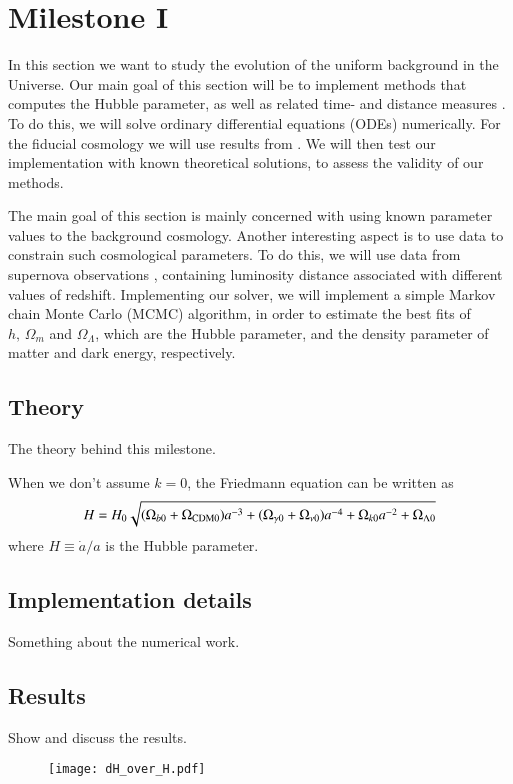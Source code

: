 \section{Milestone I}\label{M1}
In this section we want to study the evolution of the uniform background in the Universe. Our main goal of this section will be to implement methods that computes the Hubble parameter, as well as related time- and distance measures . To do this, we will solve  ordinary differential equations (ODEs) numerically. For the fiducial cosmology we will use results from \cite{Planck2020}. We will then test our implementation with known theoretical solutions, to assess the validity of our methods. 

The main goal of this section is mainly concerned with using known parameter values to  the background cosmology. Another interesting aspect is to use data to constrain such cosmological parameters. To do this, we will use data from supernova observations \cite{Supernova2014Betoule}, containing luminosity distance associated with different values of redshift. Implementing our solver, we will implement a simple Markov chain Monte Carlo (MCMC) algorithm, in order to estimate the best fits of $h,\,\Omega_m$ and $\Omega_\Lambda$, which are the Hubble parameter, and the density parameter of matter and dark energy, respectively.   


\subsection{Theory}\label{M1:theory}
The theory behind this milestone. 

When we don't assume $k=0$, the Friedmann equation can be written as 
\begin{equation}
    H = H_0 \sqrt{(\Omega_{b0} + \Omega_\mathrm{CDM0})a^{-3} + (\Omega_{\gamma 0} + \Omega_{\nu 0})a^{-4} + \Omega_{k0} a^{-2} + \Omega_{\Lambda 0}} \label{M1:theory:eq:Friedmann_H_omegas}
\end{equation}
where $H\equiv\dot{a}/a$ is the Hubble parameter. 

\subsection{Implementation details}\label{M1:implementation} 
Something about the numerical work.

\subsection{Results}\label{M1:results}
Show and discuss the results.


\begin{figure}
    \texttt{[image: dH\_over\_H.pdf]}
\end{figure}